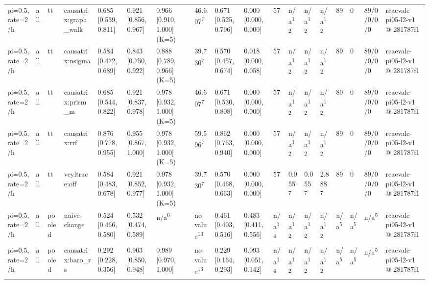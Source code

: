 \begin{table}[t]
\begin{tabular}{llllllllllllllllll}
pi=0.5, rate=2/h & all & tt & causatrix:graph\_walk & 0.685 [0.539, 0.811] & 0.921 [0.856, 0.967] & 0.966 [0.910, 1.000] (K=5) & 46.607\textsuperscript{7} & 0.671 [0.525, 0.796] & 0.000 [0.000, 0.000] & 57 & n/a\textsuperscript{12} & n/a\textsuperscript{12} & n/a\textsuperscript{12} & 89 & 0 & 89/0/0/0/0 & rcaevalc-pi05-l2-v1 @ 281787f1 \\
pi=0.5, rate=2/h & all & tt & causatrix:nsigma & 0.584 [0.472, 0.689] & 0.843 [0.750, 0.922] & 0.888 [0.789, 0.966] (K=5) & 39.730\textsuperscript{7} & 0.570 [0.457, 0.674] & 0.018 [0.000, 0.058] & 57 & n/a\textsuperscript{12} & n/a\textsuperscript{12} & n/a\textsuperscript{12} & 89 & 0 & 89/0/0/0/0 & rcaevalc-pi05-l2-v1 @ 281787f1 \\
pi=0.5, rate=2/h & all & tt & causatrix:prism\_m & 0.685 [0.544, 0.822] & 0.921 [0.837, 0.978] & 0.978 [0.932, 1.000] (K=5) & 46.607\textsuperscript{7} & 0.671 [0.530, 0.808] & 0.000 [0.000, 0.000] & 57 & n/a\textsuperscript{12} & n/a\textsuperscript{12} & n/a\textsuperscript{12} & 89 & 0 & 89/0/0/0/0 & rcaevalc-pi05-l2-v1 @ 281787f1 \\
pi=0.5, rate=2/h & all & tt & causatrix:rrf & 0.876 [0.778, 0.955] & 0.955 [0.867, 1.000] & 0.978 [0.932, 1.000] (K=5) & 59.596\textsuperscript{7} & 0.862 [0.763, 0.940] & 0.000 [0.000, 0.000] & 57 & n/a\textsuperscript{12} & n/a\textsuperscript{12} & n/a\textsuperscript{12} & 89 & 0 & 89/0/0/0/0 & rcaevalc-pi05-l2-v1 @ 281787f1 \\
pi=0.5, rate=2/h & all & tt & veyltrace:off & 0.584 [0.483, 0.678] & 0.921 [0.852, 0.977] & 0.978 [0.932, 1.000] (K=5) & 39.730\textsuperscript{7} & 0.570 [0.468, 0.663] & 0.000 [0.000, 0.000] & 57 & 0.955\textsuperscript{7} & 0.055\textsuperscript{7} & 2.888\textsuperscript{7} & 89 & 0 & 89/0/0/0/0 & rcaevalc-pi05-l2-v1 @ 281787f1 \\
pi=0.5, rate=2/h & all & pooled & naive-change & 0.524 [0.466, 0.580] & 0.532 [0.474, 0.589] & n/a\textsuperscript{6} & no value\textsuperscript{13} & 0.461 [0.403, 0.516] & 0.483 [0.411, 0.556] & n/a\textsuperscript{14} & n/a\textsuperscript{12} & n/a\textsuperscript{12} & n/a\textsuperscript{12} & n/a\textsuperscript{5} & n/a\textsuperscript{5} & n/a\textsuperscript{5} & rcaevalc-pi05-l2-v1 @ 281787f1 \\
pi=0.5, rate=2/h & all & pooled & causatrix:baro\_rs & 0.292 [0.228, 0.356] & 0.903 [0.850, 0.948] & 0.989 [0.970, 1.000] & no value\textsuperscript{13} & 0.229 [0.164, 0.293] & 0.093 [0.051, 0.142] & n/a\textsuperscript{14} & n/a\textsuperscript{12} & n/a\textsuperscript{12} & n/a\textsuperscript{12} & n/a\textsuperscript{5} & n/a\textsuperscript{5} & n/a\textsuperscript{5} & rcaevalc-pi05-l2-v1 @ 281787f1 \\

\end{tabular}
\end{table}
